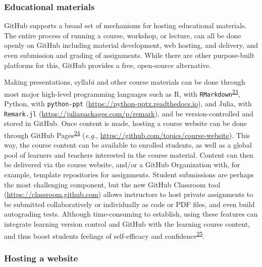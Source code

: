 \hypertarget{educational-materials}{%
\subsubsection{Educational materials}\label{educational-materials}}

GitHub supports a broad set of mechanisms for hosting educational materials.
The entire process of running a course, workshop, or lecture, can all be done openly on GitHub including material development, web hosting, and delivery, and even submission and grading of assignments.
While there are other purpose-built platforms for this, GitHub provides a free, open-source alternative.

Making presentations, syllabi and other course materials can be done through most major high-level programming languages such as R, with \texttt{RMarkdown}\textsuperscript{\protect\hyperlink{ref-QqMezOMg}{23}}, Python, with \texttt{python-ppt} (\url{https://python-pptx.readthedocs.io}), and Julia, with \texttt{Remark.jl} (\url{https://juliapackages.com/p/remark}), and be version-controlled and stored in GitHub.
Once content is made, hosting a course website can be done through GitHub Pages\textsuperscript{\protect\hyperlink{ref-MDQfMwCW}{24}} (\emph{e.g.}, \url{https://github.com/topics/course-website}).
This way, the course content can be available to enrolled students, as well as a global pool of learners and teachers interested in the course material.
Content can then be delivered via the course website, and/or a GitHub Organization with, for example, template repositories for assignments.
Student submissions are perhaps the most challenging component, but the new GitHub Classroom tool (\url{https://classroom.github.com}) allows instructors to host private assignments to be submitted collaboratively or individually as code or PDF files, and even build autograding tests.
Although time-consuming to establish, using these features can integrate learning version control and GitHub with the learning course content, and thus boost students feelings of self-efficacy and confidence\textsuperscript{\protect\hyperlink{ref-dqrFjoSb}{25}}.

\hypertarget{hosting-a-website}{%
\subsubsection{Hosting a website}\label{hosting-a-website}}

